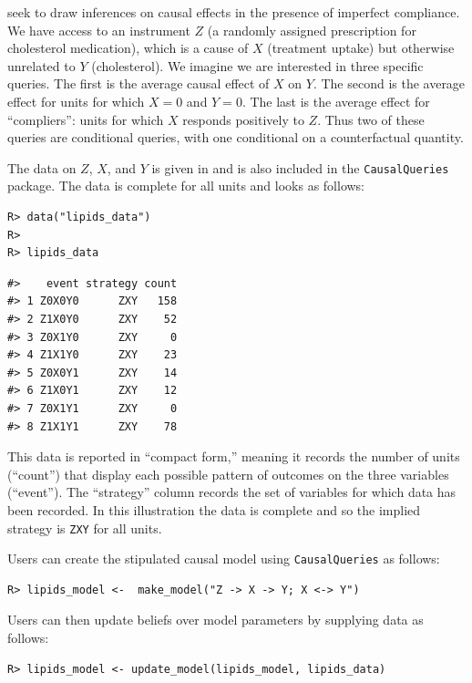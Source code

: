 \documentclass[
  11pt,
  article]{jss}
\begin{document}
\citet{chickering_clinicians_1996} seek to draw inferences on causal
effects in the presence of imperfect compliance. We have access to an
instrument \(Z\) (a randomly assigned prescription for cholesterol
medication), which is a cause of \(X\) (treatment uptake) but otherwise
unrelated to \(Y\) (cholesterol). We imagine we are interested in three
specific queries. The first is the average causal effect of \(X\) on
\(Y\). The second is the average effect for units for which \(X=0\) and
\(Y=0\). The last is the average effect for ``compliers'': units for
which \(X\) responds positively to \(Z\). Thus two of these queries are
conditional queries, with one conditional on a counterfactual quantity.

The data on \(Z\), \(X\), and \(Y\) is given in
\citet{chickering_clinicians_1996} and is also included in the
\texttt{CausalQueries} package. The data is complete for all units and
looks as follows:

\begin{verbatim}
R> data("lipids_data")
R> 
R> lipids_data
\end{verbatim}

\begin{verbatim}
#>    event strategy count
#> 1 Z0X0Y0      ZXY   158
#> 2 Z1X0Y0      ZXY    52
#> 3 Z0X1Y0      ZXY     0
#> 4 Z1X1Y0      ZXY    23
#> 5 Z0X0Y1      ZXY    14
#> 6 Z1X0Y1      ZXY    12
#> 7 Z0X1Y1      ZXY     0
#> 8 Z1X1Y1      ZXY    78
\end{verbatim}

This data is reported in ``compact form,'' meaning it records the number
of units (``count'') that display each possible pattern of outcomes on
the three variables (``event''). The ``strategy'' column records the set
of variables for which data has been recorded. In this illustration the
data is complete and so the implied strategy is \texttt{ZXY} for all
units.

Users can create the stipulated causal model using
\texttt{CausalQueries} as follows:

\begin{verbatim}
R> lipids_model <-  make_model("Z -> X -> Y; X <-> Y") 
\end{verbatim}

Users can then update beliefs over model parameters by supplying data as
follows:

\begin{verbatim}
R> lipids_model <- update_model(lipids_model, lipids_data)
\end{verbatim}
\end{document}
